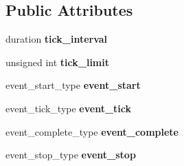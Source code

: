 \subsection*{Public Attributes}
\begin{DoxyCompactItemize}
\item 
\hypertarget{classxstd_1_1chrono_1_1timer_a57838b4d220986131fcd8f5ddc1363bc}{duration {\bfseries tick\-\_\-interval}}\label{classxstd_1_1chrono_1_1timer_a57838b4d220986131fcd8f5ddc1363bc}

\item 
\hypertarget{classxstd_1_1chrono_1_1timer_a68ac37affa234daf952955ab2c1d674e}{unsigned int {\bfseries tick\-\_\-limit}}\label{classxstd_1_1chrono_1_1timer_a68ac37affa234daf952955ab2c1d674e}

\item 
\hypertarget{classxstd_1_1chrono_1_1timer_acd6563ae4202b5d67856562d5a024894}{event\-\_\-start\-\_\-type {\bfseries event\-\_\-start}}\label{classxstd_1_1chrono_1_1timer_acd6563ae4202b5d67856562d5a024894}

\item 
\hypertarget{classxstd_1_1chrono_1_1timer_a7bfca0bacd30aabd2bf7a69e25f2574c}{event\-\_\-tick\-\_\-type {\bfseries event\-\_\-tick}}\label{classxstd_1_1chrono_1_1timer_a7bfca0bacd30aabd2bf7a69e25f2574c}

\item 
\hypertarget{classxstd_1_1chrono_1_1timer_ac12f83ed705997b32c1dcf8853cf93c9}{event\-\_\-complete\-\_\-type {\bfseries event\-\_\-complete}}\label{classxstd_1_1chrono_1_1timer_ac12f83ed705997b32c1dcf8853cf93c9}

\item 
\hypertarget{classxstd_1_1chrono_1_1timer_a2f14e4ebe72f6c127f564f2dc4e97909}{event\-\_\-stop\-\_\-type {\bfseries event\-\_\-stop}}\label{classxstd_1_1chrono_1_1timer_a2f14e4ebe72f6c127f564f2dc4e97909}

\end{DoxyCompactItemize}
